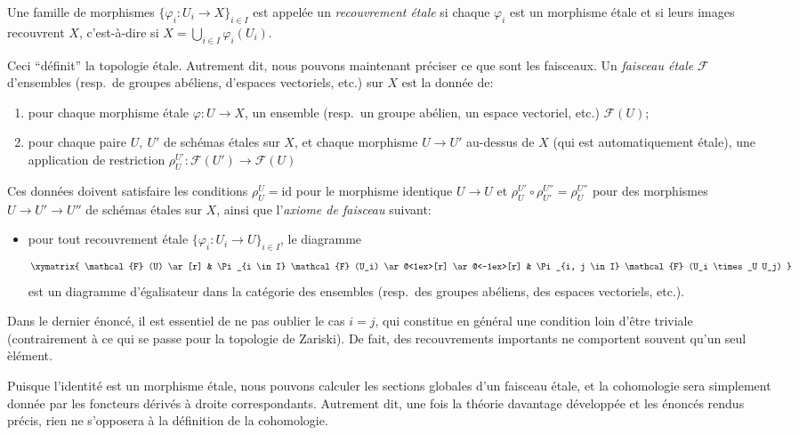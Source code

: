 \begin{definition}
\label{definition-etale-covering-initial}
Une famille de morphismes $\{ \varphi_i : U_i \to X\}_{i \in I}$ est appel\'ee
un {\it recouvrement \'etale} si chaque $\varphi_i$ est un morphisme \'etale et
si leurs images recouvrent $X$, c'est-\`a-dire si
$X = \bigcup_{i \in I} \varphi_i(U_i)$.
\end{definition}

\noindent
Ceci ``d\'efinit'' la topologie \'etale. Autrement dit, nous pouvons maintenant
pr\'eciser ce que sont les faisceaux. Un {\it faisceau \'etale} $\mathcal{F}$
d'ensembles (resp.\ de groupes ab\'eliens, d'espaces vectoriels, etc.) sur $X$
est la donn\'ee de:
\begin{enumerate}
\item pour chaque morphisme \'etale $\varphi : U \to X$, un ensemble
(resp.\ un groupe ab\'elien, un espace vectoriel, etc.) $\mathcal{F}(U)$;
\item pour chaque paire $U, \ U'$ de sch\'emas \'etales sur $X$, et chaque
morphisme $U \to U'$ au-dessus de $X$ (qui est automatiquement \'etale), une
application de restriction
$\rho^{U'}_U : \mathcal{F}(U') \to \mathcal{F}(U)$
\end{enumerate}
Ces donn\'ees doivent satisfaire les conditions $\rho^U_U = \text{id}$ pour le
morphisme identique $U \to U$ et
$\rho^{U'}_U \circ \rho^{U''}_{U'} = \rho^{U''}_U$ pour des morphismes
$U \to U' \to U''$ de sch\'emas \'etales sur $X$, ainsi que l'{\it axiome de
faisceau} suivant:
\begin{itemize}
\item[(*)] pour tout recouvrement \'etale $\{ \varphi_i : U_i \to U\}_{i \in
I}$, le diagramme
$$
\xymatrix{
\mathcal{F} (U) \ar[r] &
\Pi_{i \in I} \mathcal{F} (U_i) \ar@<1ex>[r] \ar@<-1ex>[r] &
\Pi_{i, j \in I} \mathcal{F} (U_i \times_U U_j)
}
$$
est un diagramme d'\'egalisateur dans la cat\'egorie des ensembles
(resp.\ des groupes ab\'eliens, des espaces vectoriels, etc.).
\end{itemize}

\begin{remark}
\label{remark-i-is-j}
Dans le dernier \'enonc\'e, il est essentiel de ne pas oublier le cas $i = j$,
qui constitue en g\'en\'eral une condition loin d'\^etre triviale (contrairement
\`a ce qui se passe pour la topologie de Zariski). De fait, des recouvrements
importants ne comportent souvent qu'un seul \`el\'ement.
\end{remark}

\noindent
Puisque l'identit\'e est un morphisme \'etale, nous pouvons calculer les sections
globales d'un faisceau \'etale, et la cohomologie sera simplement donn\'ee par les
foncteurs d\'eriv\'es \`a droite correspondants. Autrement dit, une fois la th\'eorie
davantage d\'evelopp\'ee et les \'enonc\'es rendus pr\'ecis, rien ne s'opposera \`a la
d\'efinition de la cohomologie.




